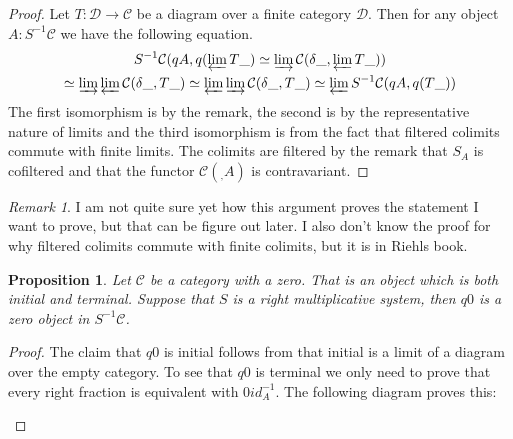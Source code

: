 \documentclass[12pt]{article}
\newtheorem{prop}[theorem]{Proposition}
\theoremstyle{definition}
\theoremstyle{remark}
\newtheorem*{remark}{Remark}
\begin{document}
            \begin{proof}
                Let $T:\mathcal{D}\rightarrow\mathcal{C}$ be a diagram over a finite category $\mathcal{D}$. Then for any object $A:S^{-1}\mathcal{C}$ we have the following equation.
                \begin{multline*}
                    S^{-1}\mathcal{C}(qA,q(\varprojlim T\_)\simeq \varinjlim\mathcal{C}(\delta\_,\varprojlim T\_))\\
                    \simeq \varinjlim\varprojlim\mathcal{C}(\delta\_,T\_)\simeq \varprojlim\varinjlim\mathcal{C}(\delta\_,T\_)\simeq \varprojlim S^{-1}\mathcal{C}(qA,q(T\_))
                \end{multline*}
                The first isomorphism is by the remark, the second is by the representative nature of limits and the third isomorphism is from the fact that filtered colimits commute with finite limits. The colimits are filtered by the remark that $S_A$ is cofiltered and that the functor $\mathcal{C}(_,A)$ is contravariant.
            \end{proof}

            \begin{remark}
                I am not quite sure yet how this argument proves the statement I want to prove, but that can be figure out later. I also don't know the proof for why filtered colimits commute with finite colimits, but it is in Riehls book.
            \end{remark}

            \begin{prop}
                Let $\mathcal{C}$ be a category with a zero. That is an object which is both initial and terminal. Suppose that $S$ is a right multiplicative system, then $q0$ is a zero object in $S^{-1}\mathcal{C}$.
            \end{prop}

            \begin{proof}
                The claim that $q0$ is initial follows from that initial is a limit of a diagram over the empty category. To see that $q0$ is terminal we only need to prove that every right fraction is equivalent with $0id_A^{-1}$. The following diagram proves this:
                \begin{center}
                \end{center}
            \end{proof}
\end{document}
